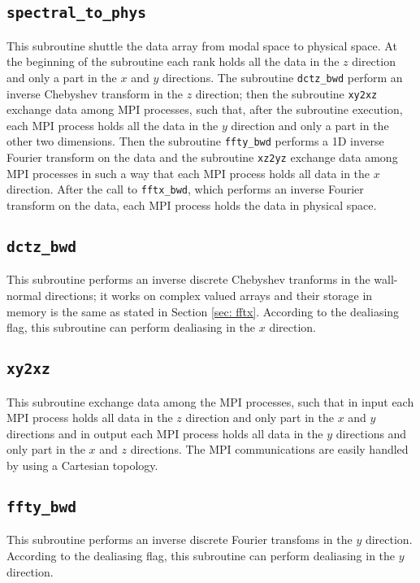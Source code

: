 \subsection{\texttt{spectral\_to\_phys}}
This subroutine shuttle the data array from modal space to physical space. At the beginning of the subroutine each rank holds all the data in the $z$ direction and only a part in the $x$ and $y$ directions. The subroutine \texttt{dctz\_bwd} perform an inverse Chebyshev transform in the $z$ direction; then the subroutine \texttt{xy2xz} exchange data among MPI processes, such that, after the subroutine execution, each MPI process holds all the data in the $y$ direction and only a part in the other two dimensions. Then the subroutine \texttt{ffty\_bwd} performs a 1D inverse Fourier transform on the data and the subroutine \texttt{xz2yz} exchange data among MPI processes in such a way that each MPI process holds all data in the $x$ direction. After the call to \texttt{fftx\_bwd}, which performs an inverse Fourier transform on the data, each MPI process holds the data in physical space.

\subsection{\texttt{dctz\_bwd}}
This subroutine performs an inverse discrete Chebyshev tranforms in the wall-normal directions; it works on complex valued arrays and their storage in memory is the same as stated in Section \ref{sec: fftx}. According to the dealiasing flag, this subroutine can perform dealiasing in the $x$ direction.

\subsection{\texttt{xy2xz}}
This subroutine exchange data among the MPI processes, such that in input each MPI process holds all data in the $z$ direction and only part in the $x$ and $y$ directions and in output each MPI process holds all data in the $y$ directions and only part in the $x$ and $z$ directions. The MPI communications are easily handled by using a Cartesian topology.

\subsection{\texttt{ffty\_bwd}}
This subroutine performs an inverse discrete Fourier transfoms in the $y$ direction. According to the dealiasing flag, this subroutine can perform dealiasing in the $y$ direction.

